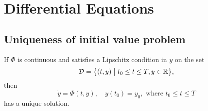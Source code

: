 \chapter{Differential Equations}

\section{Uniqueness of initial value problem}
\begin{theorem}
\label{uniqueivp}
If \(\Phi\) is continuous and satisfies a Lipschitz condition in \(y\) on the set
\[ \mathcal{D} = \Set{(t, y)}{t_0 \leq t \leq T, y\in\R}, \]
then
\[ \dot{y} = \Phi(t, y), \quad  y(t_0) = y_0, \text{ where } t_0 \leq t \leq T \]
has a unique solution.
\end{theorem}
